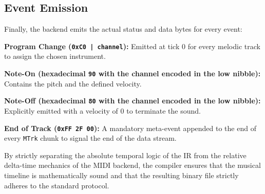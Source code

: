 \subsection{Event Emission}\label{detail-subsec:event-emission}

Finally, the backend emits the actual status and data bytes for every event:

\noindent \textbf{Program Change (\texttt{0xC0 | channel}):} Emitted at tick 0 for every melodic track to assign the
chosen instrument.

\noindent \textbf{Note-On (hexadecimal \texttt{90} with the channel encoded in the low nibble):} Contains the pitch and
the defined velocity.

\noindent \textbf{Note-Off (hexadecimal \texttt{80} with the channel encoded in the low nibble):} Explicitly
emitted with
a velocity of 0 to terminate the sound.

\noindent \textbf{End of Track (\texttt{0xFF 2F 00}):} A mandatory meta-event appended to the end of every \texttt{MTrk}
chunk to signal the end of the data stream.

By strictly separating the absolute temporal logic of the IR from the relative delta-time mechanics of the MIDI backend,
the compiler ensures that the musical timeline is mathematically sound and that the resulting binary file strictly
adheres to the standard protocol.
